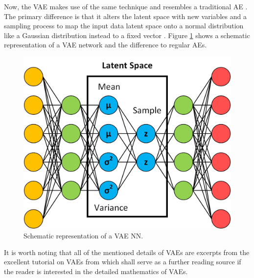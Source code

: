 \documentclass[MGS,Master,english]{twbook}%
\begin{document}
Now, the \ac{VAE} makes use of the same technique and resembles a traditional \ac{AE} \cite{ml::vae::tutorial}. The primary difference is that it alters the latent space with new variables and a sampling process to map the input data latent space onto a normal distribution like a Gaussian distribution instead to a fixed vector \cite{ml::vae::tutorial}. Figure \ref{fig::vae} shows a schematic representation of a \ac{VAE} network and the difference to regular \acp{AE}. 
\begin{figure}[!htbp]
	\centering
	\includegraphics[width=0.65\linewidth]{PICs/NNs/variational_autoencoder}
	\caption{Schematic representation of a \ac{VAE} \ac{NN}.} \label{fig::vae}
\end{figure}

It is worth noting that all of the mentioned details of \acp{VAE} are excerpts from the excellent tutorial on \acp{VAE} from \citep{ml::vae::tutorial} which shall serve as a further reading source if the reader is interested in the detailed mathematics of \acp{VAE}.
\end{document}
